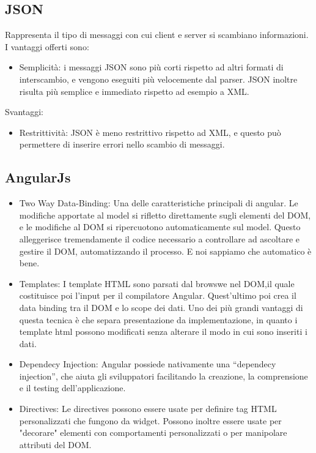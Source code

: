 \subsection{JSON}
Rappresenta il tipo di messaggi con cui client e server si scambiano informazioni. I vantaggi offerti sono:
\begin{itemize}
\item Semplicità: i messaggi JSON sono più corti rispetto ad altri formati di interscambio, e vengono eseguiti più velocemente dal parser. JSON inoltre risulta più semplice e immediato rispetto ad esempio a XML.
\end{itemize}
Svantaggi:
\begin{itemize}
\item Restrittività: JSON è meno restrittivo rispetto ad XML, e questo può permettere di inserire errori nello scambio di messaggi.
\end{itemize}

\subsection{AngularJs}
\begin{itemize}
\item Two Way Data-Binding: Una delle caratteristiche principali di angular. Le modifiche apportate al model si rifletto direttamente sugli elementi del DOM, e le modifiche al DOM si ripercuotono automaticamente sul model. Questo alleggerisce tremendamente il codice necessario a controllare ad ascoltare e gestire il DOM, automatizzando il processo. E noi sappiamo che automatico \`{e} bene.
\item Templates: I template HTML sono parsati dal browswe nel DOM,il quale costituisce poi l'input per il compilatore Angular. Quest'ultimo poi crea il data binding tra il DOM e lo scope dei dati. Uno dei più grandi vantaggi di questa tecnica è che separa presentazione da implementazione, in quanto i template html possono modificati senza alterare il modo in cui sono inseriti i dati.
\item Dependecy Injection: Angular possiede nativamente una “dependecy injection”, che aiuta gli sviluppatori facilitando la creazione, la comprensione e il testing dell'applicazione.
\item Directives: Le directives possono essere usate per definire tag HTML personalizzati che fungono da widget. Possono inoltre essere usate per "decorare" elementi con comportamenti personalizzati o per manipolare attributi del DOM. 

\end{itemize}

